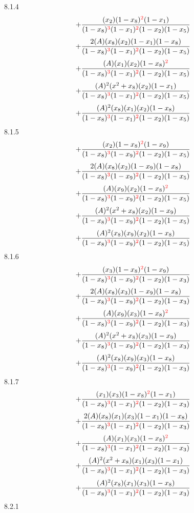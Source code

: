 \documentclass{article}
\begin{document}
8.1.4
\[+\frac{(x_2)(1-x_8)^{\textcolor{red}{2}}(1-x_1)}{(1-x_8)^{\textcolor{red}{3}}(1-x_1)^{\textcolor{red}{2}}(1-x_2)(1-x_5)}\]\[+\frac{2(A)(x_8)(x_2)(1-x_1)(1-x_8)}{(1-x_8)^{\textcolor{red}{3}}(1-x_1)^{\textcolor{red}{2}}(1-x_2)(1-x_5)}\]\[+\frac{(A)(x_1)(x_2)(1-x_8)^{\textcolor{red}{2}}}{(1-x_8)^{\textcolor{red}{3}}(1-x_1)^{\textcolor{red}{2}}(1-x_2)(1-x_5)}\]\[+\frac{(A)^{2}(x^{2}+x_8)(x_2)(1-x_1)}{(1-x_8)^{\textcolor{red}{3}}(1-x_1)^{\textcolor{red}{2}}(1-x_2)(1-x_5)}\]\[+\frac{(A)^{2}(x_8)(x_1)(x_2)(1-x_8)}{(1-x_8)^{\textcolor{red}{3}}(1-x_1)^{\textcolor{red}{2}}(1-x_2)(1-x_5)}\]
8.1.5
\[+\frac{(x_2)(1-x_8)^{\textcolor{red}{2}}(1-x_9)}{(1-x_8)^{\textcolor{red}{3}}(1-x_9)^{\textcolor{red}{2}}(1-x_2)(1-x_5)}\]\[+\frac{2(A)(x_8)(x_2)(1-x_9)(1-x_8)}{(1-x_8)^{\textcolor{red}{3}}(1-x_9)^{\textcolor{red}{2}}(1-x_2)(1-x_5)}\]\[+\frac{(A)(x_9)(x_2)(1-x_8)^{\textcolor{red}{2}}}{(1-x_8)^{\textcolor{red}{3}}(1-x_9)^{\textcolor{red}{2}}(1-x_2)(1-x_5)}\]\[+\frac{(A)^{2}(x^{2}+x_8)(x_2)(1-x_9)}{(1-x_8)^{\textcolor{red}{3}}(1-x_9)^{\textcolor{red}{2}}(1-x_2)(1-x_5)}\]\[+\frac{(A)^{2}(x_8)(x_9)(x_2)(1-x_8)}{(1-x_8)^{\textcolor{red}{3}}(1-x_9)^{\textcolor{red}{2}}(1-x_2)(1-x_5)}\]
8.1.6
\[+\frac{(x_3)(1-x_8)^{\textcolor{red}{2}}(1-x_9)}{(1-x_8)^{\textcolor{red}{3}}(1-x_9)^{\textcolor{red}{2}}(1-x_2)(1-x_3)}\]\[+\frac{2(A)(x_8)(x_3)(1-x_9)(1-x_8)}{(1-x_8)^{\textcolor{red}{3}}(1-x_9)^{\textcolor{red}{2}}(1-x_2)(1-x_3)}\]\[+\frac{(A)(x_9)(x_3)(1-x_8)^{\textcolor{red}{2}}}{(1-x_8)^{\textcolor{red}{3}}(1-x_9)^{\textcolor{red}{2}}(1-x_2)(1-x_3)}\]\[+\frac{(A)^{2}(x^{2}+x_8)(x_3)(1-x_9)}{(1-x_8)^{\textcolor{red}{3}}(1-x_9)^{\textcolor{red}{2}}(1-x_2)(1-x_3)}\]\[+\frac{(A)^{2}(x_8)(x_9)(x_3)(1-x_8)}{(1-x_8)^{\textcolor{red}{3}}(1-x_9)^{\textcolor{red}{2}}(1-x_2)(1-x_3)}\]
8.1.7
\[+\frac{(x_1)(x_3)(1-x_8)^{\textcolor{red}{2}}(1-x_1)}{(1-x_8)^{\textcolor{red}{3}}(1-x_1)^{\textcolor{red}{2}}(1-x_2)(1-x_3)}\]\[+\frac{2(A)(x_8)(x_1)(x_3)(1-x_1)(1-x_8)}{(1-x_8)^{\textcolor{red}{3}}(1-x_1)^{\textcolor{red}{2}}(1-x_2)(1-x_3)}\]\[+\frac{(A)(x_1)(x_3)(1-x_8)^{\textcolor{red}{2}}}{(1-x_8)^{\textcolor{red}{3}}(1-x_1)^{\textcolor{red}{2}}(1-x_2)(1-x_3)}\]\[+\frac{(A)^{2}(x^{2}+x_8)(x_1)(x_3)(1-x_1)}{(1-x_8)^{\textcolor{red}{3}}(1-x_1)^{\textcolor{red}{2}}(1-x_2)(1-x_3)}\]\[+\frac{(A)^{2}(x_8)(x_1)(x_3)(1-x_8)}{(1-x_8)^{\textcolor{red}{3}}(1-x_1)^{\textcolor{red}{2}}(1-x_2)(1-x_3)}\]
8.2.1
\end{document}
